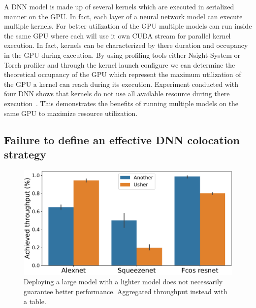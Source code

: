 A DNN model is made up of several kernels which are executed in serialized manner on the GPU. In fact, each layer of a neural network model can execute multiple kernels. For better utilization of the GPU multiple models can run inside the same GPU where each will use it own CUDA stream for parallel kernel execution. In fact, kernels can be characterized by there duration and occupancy in the GPU during execution. By using profiling tools either Nsight-System or Torch profiler and through the kernel launch configure we can determine the theoretical occupancy of the GPU which represent the maximum utilization of the GPU a kernel can reach during its execution. Experiment conducted with four DNN shows that kernels do not use all available resource during there execution~. This demonstrates the benefits of running multiple models on the same GPU to maximize resource utilization.


\subsection{Failure to define an effective DNN colocation strategy}


\begin{figure}[t!]
	\centering
	\includegraphics[width=\linewidth]{chapters/roomie/images/aggregate_performance_drop_model.pdf}
	\caption{Deploying a large model with a lighter model does not necessarily guarantee better performance. Aggregated throughput instead with a table.}
	\label{fig:performance_drop_model}
\end{figure}

